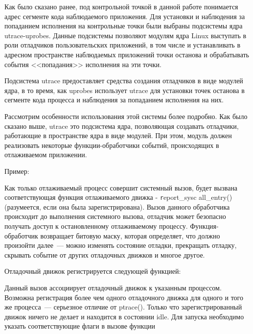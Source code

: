 Как было сказано ранее, под контрольной точкой в данной работе
понимается адрес сегменте кода наблюдаемого приложения.
Для установки и наблюдения за попаданием исполнения на
контрольные точки были выбраны подсистемы ядра utrace-uprobes.
Данные подсистемы позволяют модулям ядра Linux выступать в
роли отладчиков пользовательских приложений, в том числе и
устанавливать в адресном пространстве наблюдаемых приложений
точки останова и обрабатывать события <<попадания>> исполнения
на эти точки.

Подсистема utrace предоставляет средства создания 
отладчиков в виде модулей ядра, в то время, как 
uprobes использует utrace для установки точек 
останова в сегменте кода процесса и наблюдения за попаданием 
исполнения на них. 

Рассмотрим особенности использования этой системы 
более подробно. Как было сказано выше, utrace это подсистема
ядра, позволяющая создавать отладчики, работающие в 
пространстве ядра в виде модулей. При этом, модуль 
должен реализовать некоторые функции-обработчики 
событий, происходящих в отлаживаемом приложении. 

Пример:



\bigskip
Как только отлаживаемый процесс совершит системный вызов, будет вызвана 
соответствующая функция отлаживаемого движка - {\texttt report\_sysc
all\_entry()} (разумеется, если она была зарегистрирована). Вызов 
данного обработчика происходит до выполнения системного вызова, 
отладчик может безопасно получать доступ к остановленному отлаживаемому 
процессу. Функция-обработчик возвращает битовую маску, которая определяет, что 
должно произойти далее~--- можно изменять состояние отладки, 
прекращать отладку, скрывать событие от других отладочных 
движков и многое другое. 

Отладочный движок регистрируется следующей функцией: 



\bigskip 
Данный вызов ассоциирует отладочный движок к указанным процессом. 
Возможна регистрация более чем одного отладочного движка для 
одного и того же процесса~--- серьезное отличие от ptrace(). 
Только что зарегистрированный движок ничего не делает и 
находится в состоянии idle. Для запуска необходимо указать 
соответствующие флаги в вызове функции 


